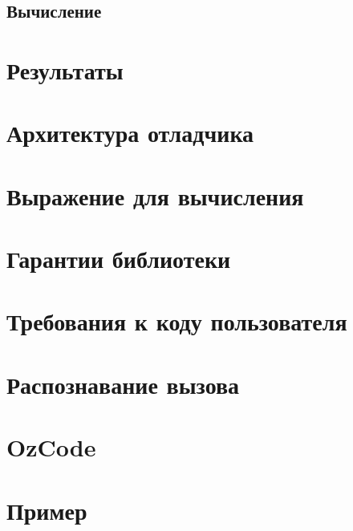 \subsection{Вычисление}


\section{Результаты}



\appendix
\section{Архитектура отладчика}

\section{Выражение для вычисления}

\section{Гарантии библиотеки}

\section{Требования к коду пользователя}

\section{Распознавание вызова}


\section{OzCode}


\section{Пример}


